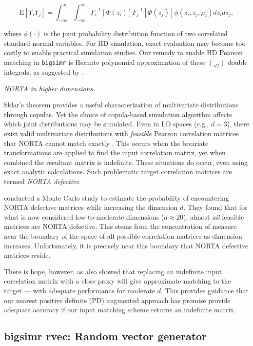 \documentclass[
]{jss}
\begin{document}
\begin{equation}
    \mathrm{E}\left[Y_i Y_j\right] = \int_{-\infty}^{\infty} \int_{-\infty}^{\infty} F_i^{-1}\left[\Phi(z_i)\right] F_j^{-1}\left[\Phi(z_j)\right] \phi(z_i, z_j, \rho_z) dz_i dz_j,
    \label{eq:pearsonIntegralRelation}
\end{equation}

where \(\phi(\cdot)\) is the joint probability distribution function of
two correlated standard normal variables. For HD simulation, exact
evaluation may become too costly to enable practical simulation studies.
Our remedy to enable HD Pearson matching in \texttt{bigsimr} is Hermite
polynomial approximation of these \(\choose{d}{2}\) double integrals, as
suggested by \citet{XZ19}.

\emph{NORTA in higher dimensions}

Sklar's theorem provides a useful characterization of multivariate
distributions through copulas. Yet the choice of copula-based simulation
algorithm affects which joint distributions may be simulated. Even in LD
spaces (e.g., \(d=3\)), there exist valid multivariate distributions
with \emph{feasible} Pearson correlation matrices that NORTA cannot
match exactly \citep{LH75}. This occurs when the bivariate
transformations are applied to find the input correlation matrix, yet
when combined the resultant matrix is indefinite. These situations do
occur, even using exact analytic calculations. Such problematic target
correlation matrices are termed \emph{NORTA defective}.

\citet{GH02} conducted a Monte Carlo study to estimate the probability
of encountering NORTA defective matrices while increasing the dimension
\(d\). They found that for what is now considered low-to-moderate
dimensions (\(d \approx 20\)), almost \emph{all} feasible matrices are
NORTA defective. This stems from the concentration of measure near the
boundary of the space of all possible correlation matrices as dimension
increases. Unfortunately, it is precisely near this boundary that NORTA
defective matrices reside.

There is hope, however, as \citet{GH02} also showed that replacing an
indefinite input correlation matrix with a close proxy will give
approximate matching to the target --- with adequate performance for
moderate \(d\). This provides guidance that our nearest positive
definite (PD) augmented approach has promise provide adequate accuracy
if our input matching scheme returns an indefinite matrix.

\hypertarget{rand-vec-gen}{%
\subsection{bigsimr rvec: Random vector generator}\label{rand-vec-gen}}
\end{document}
